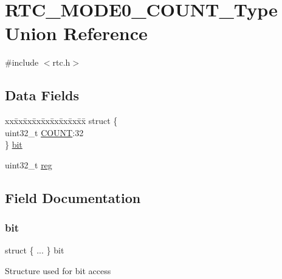 \hypertarget{union_r_t_c___m_o_d_e0___c_o_u_n_t___type}{}\section{R\+T\+C\+\_\+\+M\+O\+D\+E0\+\_\+\+C\+O\+U\+N\+T\+\_\+\+Type Union Reference}
\label{union_r_t_c___m_o_d_e0___c_o_u_n_t___type}


{\ttfamily \#include $<$rtc.\+h$>$}

\subsection*{Data Fields}
\begin{DoxyCompactItemize}
\item 
\begin{tabbing}
xx\=xx\=xx\=xx\=xx\=xx\=xx\=xx\=xx\=\kill
struct \{\\
\>uint32\_t \mbox{\hyperlink{union_r_t_c___m_o_d_e0___c_o_u_n_t___type_aa9f8906e3d27dfbf12691127c9bb88ba}{COUNT}}:32\\
\} \mbox{\hyperlink{union_r_t_c___m_o_d_e0___c_o_u_n_t___type_a895a6748cb2d64772aba250b601cddcd}{bit}}\\

\end{tabbing}\item 
uint32\+\_\+t \mbox{\hyperlink{union_r_t_c___m_o_d_e0___c_o_u_n_t___type_a6b91636401516a477989a336376d7b40}{reg}}
\end{DoxyCompactItemize}


\subsection{Field Documentation}
\mbox{\label{union_r_t_c___m_o_d_e0___c_o_u_n_t___type_a895a6748cb2d64772aba250b601cddcd}} 
\subsubsection{\texorpdfstring{bit}{bit}}
{\footnotesize\ttfamily struct \{ ... \}   bit}

Structure used for bit access \mbox{\label{union_r_t_c___m_o_d_e0___c_o_u_n_t___type_aa9f8906e3d27dfbf12691127c9bb88ba}} 
